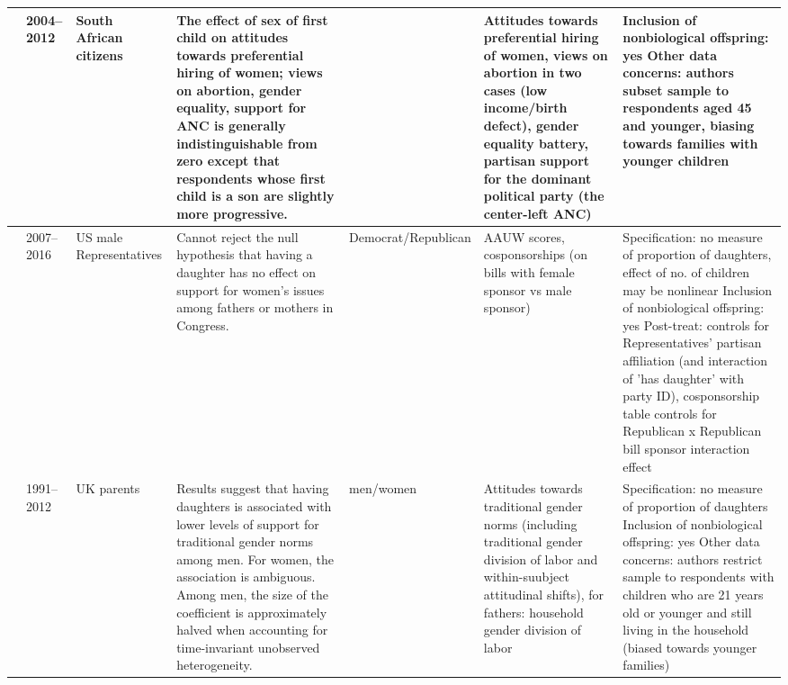 \begin{longtable}{p{}p{}p{}p{}p{}p{}p{}}
   \midrule
\cite{clayton2019daughters} & 2004--2012 & South African citizens & The effect of sex of first child on attitudes towards preferential hiring of women; views on abortion, gender equality, support for ANC is generally indistinguishable from zero except that respondents whose first child is a son are slightly more progressive. &  & Attitudes towards preferential hiring of women, views on abortion in two cases (low income/birth defect), gender equality battery, partisan support for the dominant political party (the center-left ANC) & Inclusion of nonbiological offspring: yes
Other data concerns: authors subset sample to respondents aged 45 and younger, biasing towards families with younger children \\ 
   \midrule
\cite{costa2019family} & 2007--2016 & US male Representatives & Cannot reject the null hypothesis that having a daughter has no effect on support for women’s issues among fathers or mothers in Congress. & Democrat/Republican & AAUW scores, cosponsorships (on bills with female sponsor vs male sponsor) & Specification: no measure of proportion of daughters, effect of no. of children may be nonlinear
Inclusion of nonbiological offspring: yes
Post-treat: controls for Representatives' partisan affiliation (and interaction of 'has daughter' with party ID), cosponsorship table controls for Republican x Republican bill sponsor interaction effect \\ 
   \midrule
\cite{borrell2019mighty} & 1991--2012 & UK parents & Results suggest that having daughters is associated with lower levels of support for traditional gender norms among men. For women, the association is ambiguous. Among men, the size of the coefficient is approximately halved when accounting for time-invariant unobserved heterogeneity. & men/women & Attitudes towards traditional gender norms (including traditional gender division of labor and within-suubject attitudinal shifts),  
for fathers: household gender division of labor & Specification: no measure of proportion of daughters
Inclusion of nonbiological offspring: yes
Other data concerns: authors restrict sample to respondents with children who are 21 years old or younger and still living in the household (biased towards younger families) \\ 
   \midrule

\end{longtable}
